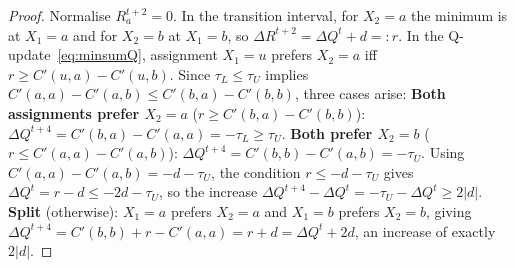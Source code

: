 \documentclass[letterpaper]{article} %
\theoremstyle{definition}
\theoremstyle{remark}
\begin{document}
\begin{proof}
Normalise $R^{t+2}_a = 0$.  In the transition interval, for $X_2=a$ the minimum is at $X_1=a$ and for $X_2=b$ at $X_1=b$, so $\Delta R^{t+2} = \Delta Q^t + d =: r$.
In the Q-update~\eqref{eq:minsumQ}, assignment $X_1=u$ prefers $X_2 = a$ iff $r \geq C'(u,a)-C'(u,b)$.  Since $\tau_L \leq \tau_U$ implies $C'(a,a)-C'(a,b) \leq C'(b,a)-C'(b,b)$, three cases arise:
\textbf{Both assignments prefer $X_2 = a$} ($r \geq C'(b,a)-C'(b,b)$): $\Delta Q^{t+4} = C'(b,a)-C'(a,a) = -\tau_L \geq \tau_U$.
\textbf{Both prefer $X_2 = b$} ($r \leq C'(a,a)-C'(a,b)$): $\Delta Q^{t+4} = C'(b,b)-C'(a,b) = -\tau_U$.  Using $C'(a,a)-C'(a,b) = -d-\tau_U$, the condition $r \leq -d-\tau_U$ gives $\Delta Q^t = r-d \leq -2d-\tau_U$, so the increase $\Delta Q^{t+4}-\Delta Q^t = -\tau_U-\Delta Q^t \geq 2|d|$.
\textbf{Split} (otherwise): $X_1=a$ prefers $X_2=a$ and $X_1=b$ prefers $X_2=b$, giving $\Delta Q^{t+4} = C'(b,b)+r-C'(a,a) = r+d = \Delta Q^t+2d$, an increase of exactly $2|d|$. \qedhere
\end{proof}
\end{document}
